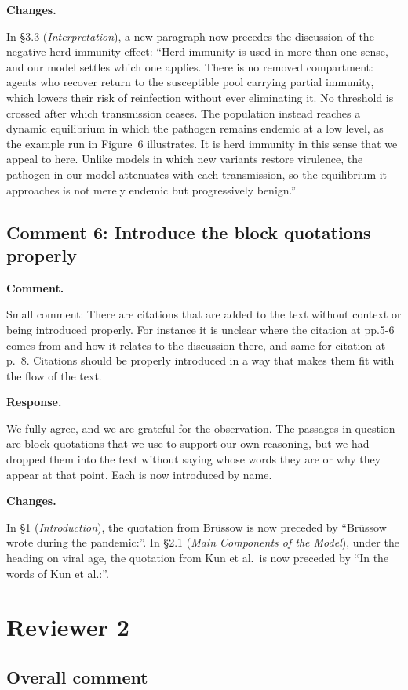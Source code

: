 \documentclass[a4paper,12pt]{article}
\newcommand{\reply}[1]{#1}
\newcommand{\rlabel}[1]{\par\medskip\noindent\textbf{#1}\par\nobreak}
\begin{document}
\rlabel{Changes.}
\reply{In \S3.3 (\emph{Interpretation}), a new paragraph now precedes the
discussion of the negative herd immunity effect: ``Herd immunity is used in
more than one sense, and our model settles which one applies. There is no
removed compartment: agents who recover return to the susceptible pool carrying
partial immunity, which lowers their risk of reinfection without ever
eliminating it. No threshold is crossed after which transmission ceases. The
population instead reaches a dynamic equilibrium in which the pathogen remains
endemic at a low level, as the example run in Figure~6 illustrates. It is herd
immunity in this sense that we appeal to here. Unlike models in which new
variants restore virulence, the pathogen in our model attenuates with each
transmission, so the equilibrium it approaches is not merely endemic but
progressively benign.''}

\subsection*{Comment 6: Introduce the block quotations properly}

\rlabel{Comment.}
Small comment: There are citations that are added to the text without context or being introduced properly. For instance it is unclear where the citation at pp.5-6 comes from and how it relates to the discussion there, and same for citation at p.\ 8. Citations should be properly introduced in a way that makes them fit with the flow of the text.

\rlabel{Response.}
\reply{We fully agree, and we are grateful for the observation. The passages in
question are block quotations that we use to support our own reasoning, but we
had dropped them into the text without saying whose words they are or why they
appear at that point. Each is now introduced by name.}

\rlabel{Changes.}
\reply{In \S1 (\emph{Introduction}), the quotation from Br\"ussow is now
preceded by ``Br\"ussow wrote during the pandemic:''. In \S2.1 (\emph{Main
Components of the Model}), under the heading on viral age, the quotation from
Kun et al.\ is now preceded by ``In the words of Kun et al.:''.}

\bigskip

\section*{Reviewer 2}

\subsection*{Overall comment}
\end{document}
